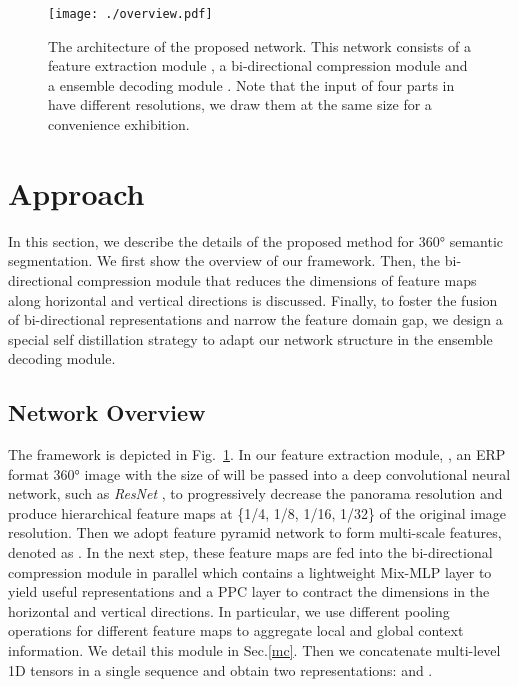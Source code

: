 \documentclass[runningheads]{llncs}
\begin{document}
	
	
	\begin{figure}[t]
		\centering
		\texttt{[image: ./overview.pdf]}
		\caption{The architecture of the proposed network. 
			This network consists of a feature extraction module , a bi-directional compression module  and a ensemble decoding module .
			Note that the input of four parts in  have different resolutions, we draw them at the same size for a convenience exhibition.
		}
		\label{overview}
	\end{figure}
	
	
	
	\section{Approach}
	
	
	
	In this section, we describe the details of the proposed method for 360° semantic segmentation.
	We first show the overview of our framework. 
	Then, the bi-directional compression module that reduces the dimensions of feature maps along horizontal and vertical directions is discussed. 
	Finally, to foster the fusion of bi-directional representations and narrow the feature domain gap, we design a special self distillation strategy to adapt our network structure in the ensemble decoding module.
	
	
	\subsection{Network Overview}
	
	The framework is depicted in Fig.~\ref{overview}.
	In our feature extraction module, , an ERP format 360° image with the size of  will be passed into a deep convolutional neural network, such as \emph{ResNet} \cite{he2016deep}, to progressively decrease the panorama resolution and produce hierarchical feature maps at \{1/4, 1/8, 1/16, 1/32\} of the original image resolution.
	Then we adopt feature pyramid network \cite{lin2017feature} to form multi-scale features, denoted as .
In the next step, these feature maps are fed into the bi-directional compression module  in parallel which contains a lightweight Mix-MLP layer to yield useful representations and a PPC layer to contract the dimensions in the horizontal and vertical directions.
	In particular, we use different pooling operations for different feature maps to aggregate local and global context information.
	We detail this module in Sec.\ref{mc}.
	Then we concatenate multi-level 1D tensors in a single sequence and obtain two representations:  and . 
\end{document}
